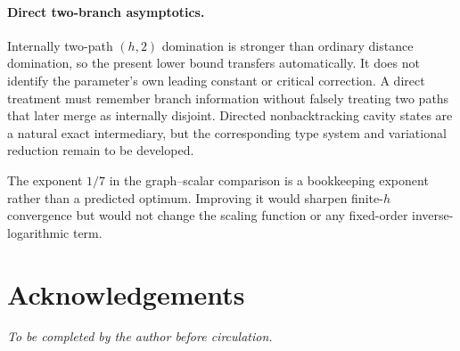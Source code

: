 \documentclass[11pt]{amsart}
\theoremstyle{definition}
\begin{document}
\paragraph{Direct two-branch asymptotics.}
Internally two-path $(h,2)$ domination is stronger than ordinary distance domination, so the present lower bound transfers automatically.  It does not identify the parameter's own leading constant or critical correction.  A direct treatment must remember branch information without falsely treating two paths that later merge as internally disjoint.  Directed nonbacktracking cavity states are a natural exact intermediary, but the corresponding type system and variational reduction remain to be developed.

The exponent $1/7$ in the graph--scalar comparison is a bookkeeping exponent rather than a predicted optimum.  Improving it would sharpen finite-$h$ convergence but would not change the scaling function or any fixed-order inverse-logarithmic term.

\section*{Acknowledgements}
\emph{To be completed by the author before circulation.}
\end{document}
